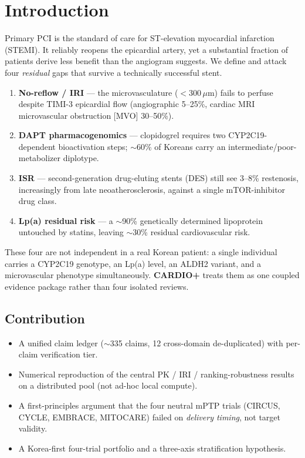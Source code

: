 \documentclass[11pt]{article}
\begin{document}
\section{Introduction}
\label{sec:intro}

Primary PCI is the standard of care for ST-elevation myocardial infarction (STEMI). It reliably reopens the epicardial artery, yet a substantial fraction of patients derive less benefit than the angiogram suggests. We define and attack four \emph{residual} gaps that survive a technically successful stent.

\begin{enumerate}[label=\textbf{T\arabic*.}]
  \item \textbf{No-reflow / IRI} --- the microvasculature ($<$300\,$\mu$m) fails to perfuse despite TIMI-3 epicardial flow (angiographic 5--25\%, cardiac MRI microvascular obstruction [MVO] 30--50\%).
  \item \textbf{DAPT pharmacogenomics} --- clopidogrel requires two CYP2C19-dependent bioactivation steps; $\sim$60\% of Koreans carry an intermediate/poor-metabolizer diplotype.
  \item \textbf{ISR} --- second-generation drug-eluting stents (DES) still see 3--8\% restenosis, increasingly from late neoatherosclerosis, against a single mTOR-inhibitor drug class.
  \item \textbf{Lp(a) residual risk} --- a $\sim$90\% genetically determined lipoprotein untouched by statins, leaving $\sim$30\% residual cardiovascular risk.
\end{enumerate}

These four are not independent in a real Korean patient: a single individual carries a CYP2C19 genotype, an Lp(a) level, an ALDH2 variant, and a microvascular phenotype simultaneously. \textbf{CARDIO+} treats them as one coupled evidence package rather than four isolated reviews.

\subsection{Contribution}
\begin{itemize}
  \item A unified claim ledger ($\sim$335 claims, 12 cross-domain de-duplicated) with per-claim verification tier.
  \item Numerical reproduction of the central PK / IRI / ranking-robustness results on a distributed pool (not ad-hoc local compute).
  \item A first-principles argument that the four neutral mPTP trials (CIRCUS, CYCLE, EMBRACE, MITOCARE) failed on \emph{delivery timing}, not target validity.
  \item A Korea-first four-trial portfolio and a three-axis stratification hypothesis.
\end{itemize}
\end{document}
